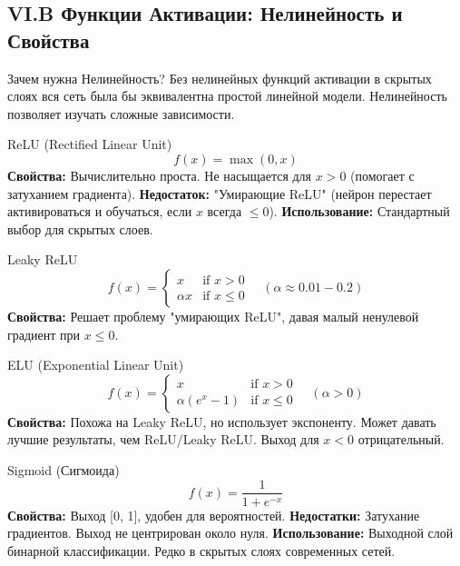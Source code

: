 \subsection{VI.B Функции Активации: Нелинейность и Свойства}

\begin{alerttextbox}{Зачем нужна Нелинейность?}
    Без нелинейных функций активации в скрытых слоях вся сеть была бы эквивалентна простой линейной модели. Нелинейность позволяет изучать сложные зависимости.
\end{alerttextbox}

\begin{myexampleblock}{ReLU (Rectified Linear Unit)}
    \[ f(x) = \max(0, x) \]
    \textbf{Свойства:} Вычислительно проста. Не насыщается для $x>0$ (помогает с затуханием градиента).
    \textbf{Недостаток:} "Умирающие ReLU" (нейрон перестает активироваться и обучаться, если $x$ всегда $\le 0$).
    \textbf{Использование:} Стандартный выбор для скрытых слоев.
\end{myexampleblock}

\begin{myexampleblock}{Leaky ReLU}
    \[ f(x) = \begin{cases} x & \text{if } x > 0 \\ \alpha x & \text{if } x \le 0 \end{cases} \quad (\alpha \approx 0.01-0.2) \]
    \textbf{Свойства:} Решает проблему "умирающих ReLU", давая малый ненулевой градиент при $x \le 0$.
\end{myexampleblock}

\begin{myexampleblock}{ELU (Exponential Linear Unit)}
     \[ f(x) = \begin{cases} x & \text{if } x > 0 \\ \alpha (e^x - 1) & \text{if } x \le 0 \end{cases} \quad (\alpha > 0) \]
    \textbf{Свойства:} Похожа на Leaky ReLU, но использует экспоненту. Может давать лучшие результаты, чем ReLU/Leaky ReLU. Выход для $x<0$ отрицательный.
\end{myexampleblock}

\begin{myexampleblock}{Sigmoid (Сигмоида)}
    \[ f(x) = \frac{1}{1 + e^{-x}} \]
    \textbf{Свойства:} Выход [0, 1], удобен для вероятностей.
    \textbf{Недостатки:} Затухание градиентов. Выход не центрирован около нуля.
    \textbf{Использование:} Выходной слой бинарной классификации. Редко в скрытых слоях современных сетей.
\end{myexampleblock}

